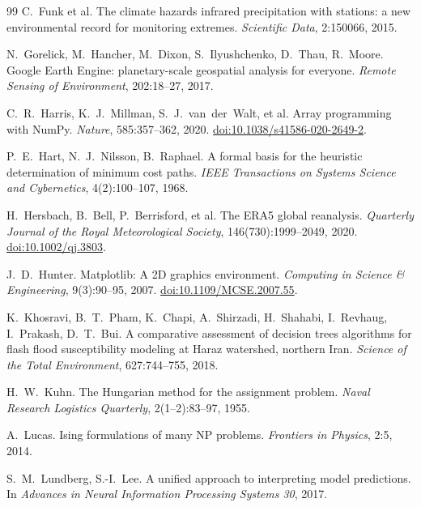 \documentclass[11pt,a4paper]{article}
\begin{document}
\begin{thebibliography}{99}
C.~Funk et al.
The climate hazards infrared precipitation with stations: a new environmental
record for monitoring extremes.
\emph{Scientific Data}, 2:150066, 2015.

N.~Gorelick, M.~Hancher, M.~Dixon, S.~Ilyushchenko, D.~Thau, R.~Moore.
Google Earth Engine: planetary-scale geospatial analysis for everyone.
\emph{Remote Sensing of Environment}, 202:18--27, 2017.

C.~R.~Harris, K.~J.~Millman, S.~J.~van~der~Walt, et al.
Array programming with NumPy.
\emph{Nature}, 585:357--362, 2020.
\href{https://doi.org/10.1038/s41586-020-2649-2}{doi:10.1038/s41586-020-2649-2}.

P.~E.~Hart, N.~J.~Nilsson, B.~Raphael.
A formal basis for the heuristic determination of minimum cost paths.
\emph{IEEE Transactions on Systems Science and Cybernetics}, 4(2):100--107, 1968.

H.~Hersbach, B.~Bell, P.~Berrisford, et al.
The ERA5 global reanalysis.
\emph{Quarterly Journal of the Royal Meteorological Society}, 146(730):1999--2049, 2020.
\href{https://doi.org/10.1002/qj.3803}{doi:10.1002/qj.3803}.

J.~D.~Hunter.
Matplotlib: A 2D graphics environment.
\emph{Computing in Science \& Engineering}, 9(3):90--95, 2007.
\href{https://doi.org/10.1109/MCSE.2007.55}{doi:10.1109/MCSE.2007.55}.

K.~Khosravi, B.~T.~Pham, K.~Chapi, A.~Shirzadi, H.~Shahabi, I.~Revhaug,
I.~Prakash, D.~T.~Bui.
A comparative assessment of decision trees algorithms for flash flood
susceptibility modeling at Haraz watershed, northern Iran.
\emph{Science of the Total Environment}, 627:744--755, 2018.

H.~W.~Kuhn.
The Hungarian method for the assignment problem.
\emph{Naval Research Logistics Quarterly}, 2(1--2):83--97, 1955.

A.~Lucas. Ising formulations of many NP problems.
\emph{Frontiers in Physics}, 2:5, 2014.

S.~M.~Lundberg, S.-I.~Lee.
A unified approach to interpreting model predictions.
In \emph{Advances in Neural Information Processing Systems 30}, 2017.


\end{thebibliography}
\end{document}
